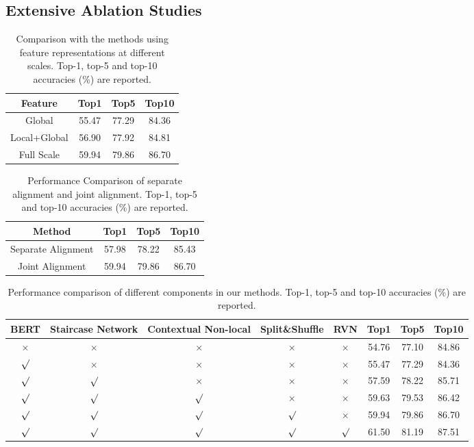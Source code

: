 \documentclass[final]{cvpr}
\begin{document}
\subsection{Extensive Ablation Studies}
\begin{table}[t]
\centering
\caption{Comparison with the methods using feature representations at different scales. Top-1, top-5 and top-10 accuracies  (\%) are reported.}
\label{tab_different_level_feature_performance}
\begin{tabular}{c|ccc}
\hline
Feature& Top1& Top5& Top10\\
\hline
Global& 55.47& 77.29& 84.36\\
Local+Global& 56.90& 77.92& 84.81\\
Full Scale& 59.94& 79.86& 86.70\\
\hline
\end{tabular}
\end{table}

\begin{table}
\centering
\caption{Performance Comparison of separate alignment and joint alignment. Top-1, top-5 and top-10 accuracies (\%) are reported.}
\label{tab_different_alignment_performance}
\begin{tabular}{c|ccc}
\hline
Method& Top1& Top5& Top10\\
\hline
Separate Alignment& 57.98& 78.22& 85.43\\
Joint Alignment& 59.94& 79.86& 86.70\\
\hline
\end{tabular}
\end{table}

\begin{table*}
\centering
\caption{Performance comparison of different components in our methods. Top-1, top-5 and top-10 accuracies (\%) are  reported.}
\label{tab_different_module_performance}
\begin{tabular}{ccccc|ccc}
\hline
BERT& Staircase Network& Contextual Non-local& Split\&Shuffle & RVN & Top1& Top5& Top10\\
\hline
$\times$& $\times$& $\times$& $\times$& $\times$& 54.76& 77.10& 84.86\\
$\surd$& $\times$& $\times$& $\times$& $\times$& 55.47& 77.29& 84.36\\
$\surd$& $\surd$& $\times$& $\times$& $\times$& 57.59& 78.22& 85.71\\
$\surd$& $\surd$& $\surd$& $\times$& $\times$& 59.63& 79.53& 86.42\\
$\surd$& $\surd$& $\surd$& $\surd$& $\times$& 59.94& 79.86& 86.70\\
$\surd$& $\surd$& $\surd$& $\surd$& $\surd$& 61.50& 81.19& 87.51\\
\hline
\end{tabular}
\end{table*}
\end{document}
